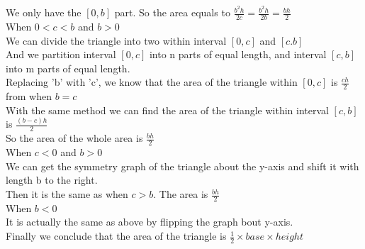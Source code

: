 \documentclass{article}
\begin{document}
We only have the $[0,b]$ part. So the area equals to $\displaystyle\frac{b^2h}{2c}=\frac{b^2h}{2b}=\frac{bh}{2}$\\

When $0<c<b$ and $b>0$\\

We can divide the triangle into two within interval $[0,c]$ and $[c.b]$\\

And we partition interval $[0,c]$ into n parts of equal length, and interval $[c,b]$ into m parts of equal length.\\

Replacing 'b' with 'c', we know that the area of the triangle within $[0,c]$ is $\displaystyle\frac{ch}{2}$ from when $b=c$\\

With the same method we can find the area of the triangle within interval $[c,b]$ is $\displaystyle\frac{(b-c)h}{2}$\\

So the area of the whole area is $\frac{bh}{2}$\\

When $c<0$ and $b>0$\\

We can get the symmetry graph of the triangle about the y-axis and shift it with length b to the right.\\

Then it is the same as when $c>b$. The area is $\displaystyle\frac{bh}{2}$\\

When $b<0$\\

It is actually the same as above by flipping the graph bout y-axis.\\

Finally we conclude that the area of the triangle is $\displaystyle\frac{1}{2}\times base\times height$\\ 
\end{document}
